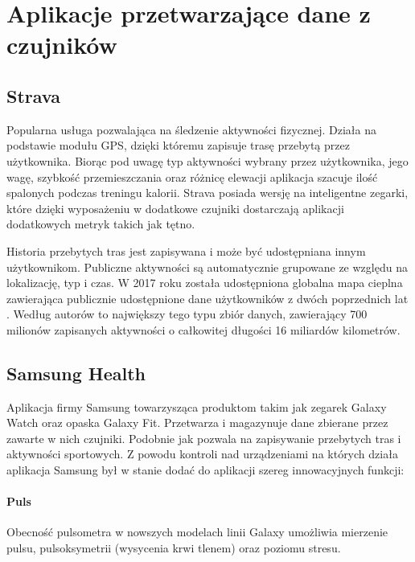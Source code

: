 \section{Aplikacje przetwarzające dane z czujników}

\subsection{Strava}
\label{sec:strava}
Popularna usługa pozwalająca na śledzenie aktywności fizycznej. Działa na podstawie modułu GPS, dzięki któremu zapisuje trasę przebytą przez użytkownika. Biorąc pod uwagę typ aktywności wybrany przez użytkownika, jego wagę, szybkość przemieszczania oraz różnicę elewacji aplikacja szacuje ilość spalonych podczas treningu kalorii. Strava posiada wersję na inteligentne zegarki, które dzięki wyposażeniu w dodatkowe czujniki dostarczają aplikacji dodatkowych metryk takich jak tętno. 

Historia przebytych tras jest zapisywana i może być udostępniana innym użytkownikom. Publiczne aktywności są automatycznie grupowane ze względu na lokalizację, typ i czas. W 2017 roku została udostępniona globalna mapa cieplna zawierająca publicznie udostępnione dane użytkowników z dwóch poprzednich lat \cite{Strava_Heatmap}. Według autorów to największy tego typu zbiór danych, zawierający 700 milionów zapisanych aktywności o całkowitej długości 16 miliardów kilometrów.


\subsection{Samsung Health}
Aplikacja firmy Samsung towarzysząca produktom takim jak zegarek Galaxy Watch oraz opaska Galaxy Fit. Przetwarza i magazynuje dane zbierane przez zawarte w nich czujniki. Podobnie jak  pozwala na zapisywanie przebytych tras i aktywności sportowych. Z powodu kontroli nad urządzeniami na których działa aplikacja Samsung był w stanie dodać do aplikacji szereg innowacyjnych funkcji:

\paragraph{Puls} Obecność pulsometra w nowszych modelach linii Galaxy umożliwia mierzenie pulsu, pulsoksymetrii (wysycenia krwi tlenem) oraz poziomu stresu. 

